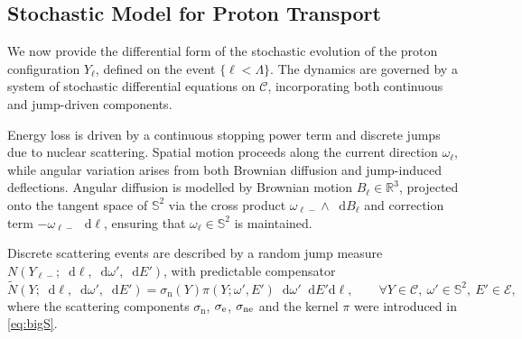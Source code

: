 \documentclass{amsart}
\newcommand{\dd}{{\mathrm d}}
\theoremstyle{plain}
\renewcommand{\d}{\mathop{}\!\mathrm{d}}
\begin{document}
\subsection{Stochastic Model for Proton Transport}
\label{subsec:sde-model}

We now provide the differential form of the stochastic evolution of
the proton configuration $Y_\ell$, defined on the event $\{\ell <
\Lambda\}$. The dynamics are governed by a system of stochastic
differential equations on $\mathcal{C}$, incorporating both continuous
and jump-driven components.

Energy loss is driven by a continuous stopping power term and discrete
jumps due to nuclear scattering. Spatial motion proceeds along the current
direction $\omega_\ell$, while angular variation arises from both
Brownian diffusion and jump-induced deflections. Angular diffusion is
modelled by Brownian motion $B_\ell \in \mathbb{R}^3$, projected onto
the tangent space of $\mathbb{S}^2$ via the cross product
$\omega_{\ell-} \wedge \d B_\ell$ and correction term
$- \omega_{\ell-} \, \d \ell$, ensuring that
$\omega_\ell \in \mathbb{S}^2$ is maintained.

Discrete scattering events are described by a random jump measure
$N(Y_{\ell-}; \d\ell, \d\omega', \d E')$, with predictable compensator
\begin{equation}
\tilde{N}(Y; \d\ell, \d\omega', \d E') 
= \sigma_{\mathrm{n}}(Y)\pi(Y; \omega',  E') \d \omega' \d E'  \dd \ell,
\qquad 
\forall Y\in\mathcal{C},~ \omega'\in\mathbb{S}^2,~ E'\in \mathcal{E},
\end{equation}
where the scattering components $\sigma_{\mathrm{n}}$, $\sigma_{\rm e}$,
$\sigma_{\rm ne}$ and the kernel $\pi$ were introduced in
\eqref{eq:bigS}.
\end{document}
